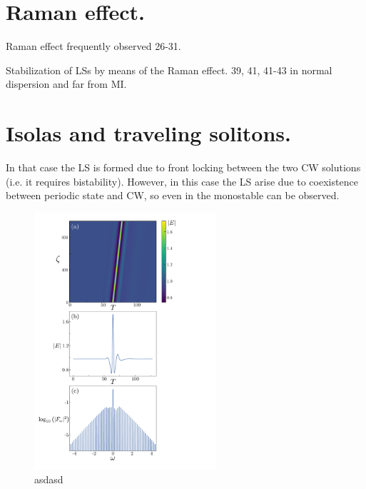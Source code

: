 \section{Raman effect.}

Raman effect frequently observed 26-31. 

Stabilization of LSs by means of the Raman effect. 39, 41, 41-43 in normal dispersion and far from MI. 

\section{Isolas and traveling solitons.}

In that case the LS is formed due to front locking between the two CW solutions (i.e. it requires bistability). 
However, in this case the LS arise due to coexistence between periodic state and CW, so even in the monostable can be observed.

\begin{figure}
    \centering
    \caption{asdasd}
    \includegraphics[width=0.6\textwidth]{imagenes/lle/LLE_Spatiotemporal.pdf}
\end{figure}

